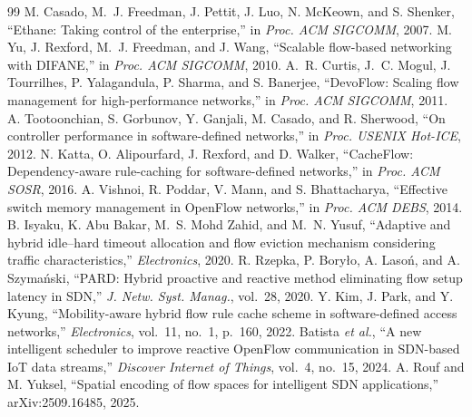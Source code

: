 \documentclass[sigconf]{acmart}
\begin{document}
\balance
\begin{thebibliography}{99}
 M. Casado, M.~J. Freedman, J. Pettit, J. Luo, N. McKeown, and S. Shenker, ``Ethane: Taking control of the enterprise,'' in \emph{Proc. ACM SIGCOMM}, 2007.
 M. Yu, J. Rexford, M.~J. Freedman, and J. Wang, ``Scalable flow-based networking with DIFANE,'' in \emph{Proc. ACM SIGCOMM}, 2010.
 A.~R. Curtis, J.~C. Mogul, J. Tourrilhes, P. Yalagandula, P. Sharma, and S. Banerjee, ``DevoFlow: Scaling flow management for high-performance networks,'' in \emph{Proc. ACM SIGCOMM}, 2011.
 A. Tootoonchian, S. Gorbunov, Y. Ganjali, M. Casado, and R. Sherwood, ``On controller performance in software-defined networks,'' in \emph{Proc. USENIX Hot-ICE}, 2012.
 N. Katta, O. Alipourfard, J. Rexford, and D. Walker, ``CacheFlow: Dependency-aware rule-caching for software-defined networks,'' in \emph{Proc. ACM SOSR}, 2016.
 A. Vishnoi, R. Poddar, V. Mann, and S. Bhattacharya, ``Effective switch memory management in OpenFlow networks,'' in \emph{Proc. ACM DEBS}, 2014.
 B. Isyaku, K. Abu Bakar, M.~S. Mohd Zahid, and M.~N. Yusuf, ``Adaptive and hybrid idle--hard timeout allocation and flow eviction mechanism considering traffic characteristics,'' \emph{Electronics}, 2020.
 R. Rzepka, P. Boryło, A. Lasoń, and A. Szymański, ``PARD: Hybrid proactive and reactive method eliminating flow setup latency in SDN,'' \emph{J. Netw. Syst. Manag.}, vol.~28, 2020.
 Y. Kim, J. Park, and Y. Kyung, ``Mobility-aware hybrid flow rule cache scheme in software-defined access networks,'' \emph{Electronics}, vol.~11, no.~1, p.~160, 2022.
 Batista \emph{et al.}, ``A new intelligent scheduler to improve reactive OpenFlow communication in SDN-based IoT data streams,'' \emph{Discover Internet of Things}, vol.~4, no.~15, 2024.
 A. Rouf and M. Yuksel, ``Spatial encoding of flow spaces for intelligent SDN applications,'' arXiv:2509.16485, 2025.


\end{thebibliography}
\end{document}
